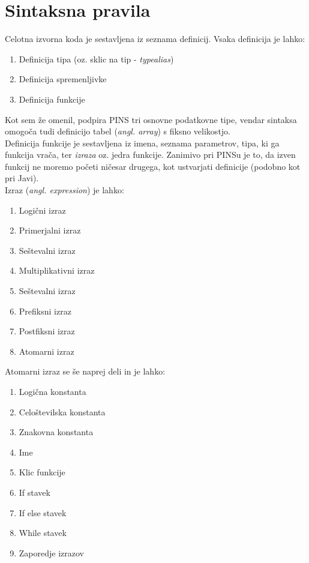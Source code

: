\documentclass[a4paper, 12pt]{book}
\begin{document}
\section{Sintaksna pravila}

Celotna izvorna koda je sestavljena iz seznama definicij. Vsaka definicija je lahko:

\begin{enumerate}
	\item Definicija tipa (oz. sklic na tip - \textit{typealias})
	\item Definicija spremenljivke
	\item Definicija funkcije
\end{enumerate}

Kot sem že omenil, podpira PINS tri osnovne podatkovne tipe, vendar sintaksa omogoča tudi definicijo tabel (\textit{angl. array}) s fiksno velikostjo. \\
\indent Definicija funkcije je sestavljena iz imena, seznama parametrov, tipa, ki ga funkcija vrača, ter \textit{izraza} oz. jedra funkcije. Zanimivo pri PINSu je to, da izven funkcij ne moremo početi ničesar drugega, kot ustvarjati definicije (podobno kot pri Javi). \\
\indent Izraz (\textit{angl. expression}) je lahko:
\begin{enumerate}
	\item Logični izraz
	\item Primerjalni izraz
	\item Seštevalni izraz
	\item Multiplikativni izraz
	\item Seštevalni izraz
	\item Prefiksni izraz
	\item Postfiksni izraz
	\item Atomarni izraz
\end{enumerate}

Atomarni izraz se še naprej deli in je lahko:
\begin{enumerate}
	\item Logična konstanta
	\item Celoštevilska konstanta
	\item Znakovna konstanta
	\item Ime
	\item Klic funkcije
	\item If stavek
	\item If else stavek
	\item While stavek
	\item Zaporedje izrazov
\end{enumerate}
\end{document}
